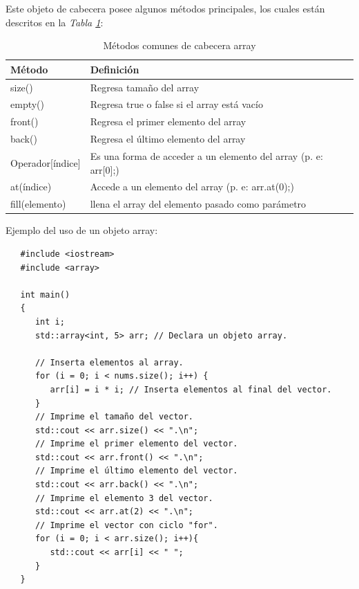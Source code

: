Este objeto de cabecera posee algunos métodos principales, los cuales están descritos en la \textit{Tabla \ref{tab: 9}}:
\begin{table}[H]
    \begin{center}
        \caption{Métodos comunes de cabecera array}
        \label{tab: 9}
        \begin{tabular}{l | l}
            \hline
            \textbf{Método} & \textbf{Definición} \\
            \hline
            size()			& Regresa tamaño del array \\
            empty()			& Regresa true o false si el array está vacío  \\
            front()			& Regresa el primer elemento del array \\
            back()			& Regresa el último elemento del array \\
            Operador[índice]	& Es una forma de acceder a un elemento del array (p. e: arr[0];) \\
            at(índice)		& Accede a un elemento del array (p. e: arr.at(0);) \\
            fill(elemento)	& llena el array del elemento pasado como parámetro \\
            \hline
        \end{tabular}
    \end{center}
\end{table}

Ejemplo del uso de un objeto array:
\begin{lstlisting}
   #include <iostream>
   #include <array>

   int main()
   {
      int i;
      std::array<int, 5> arr; // Declara un objeto array.

      // Inserta elementos al array.
      for (i = 0; i < nums.size(); i++) {
         arr[i] = i * i; // Inserta elementos al final del vector.
      }
      // Imprime el tamaño del vector.
      std::cout << arr.size() << ".\n";
      // Imprime el primer elemento del vector.
      std::cout << arr.front() << ".\n";
      // Imprime el último elemento del vector.
      std::cout << arr.back() << ".\n";
      // Imprime el elemento 3 del vector.
      std::cout << arr.at(2) << ".\n";
      // Imprime el vector con ciclo "for".
      for (i = 0; i < arr.size(); i++){
         std::cout << arr[i] << " ";
      }
   }
\end{lstlisting}


